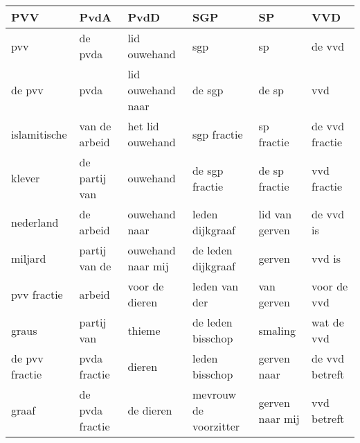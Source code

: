 \begin{tabular}{llllll}
\toprule
            PVV &             PvdA &               PvdD &                    SGP &               SP &             VVD \\
\midrule
            pvv &          de pvda &       lid ouwehand &                    sgp &               sp &          de vvd \\
         de pvv &             pvda &  lid ouwehand naar &                 de sgp &            de sp &             vvd \\
   islamitische &    van de arbeid &   het lid ouwehand &            sgp fractie &       sp fractie &  de vvd fractie \\
         klever &    de partij van &           ouwehand &         de sgp fractie &    de sp fractie &     vvd fractie \\
      nederland &        de arbeid &      ouwehand naar &        leden dijkgraaf &   lid van gerven &       de vvd is \\
        miljard &    partij van de &  ouwehand naar mij &     de leden dijkgraaf &           gerven &          vvd is \\
    pvv fractie &           arbeid &     voor de dieren &          leden van der &       van gerven &     voor de vvd \\
          graus &       partij van &             thieme &      de leden bisschop &          smaling &      wat de vvd \\
 de pvv fractie &     pvda fractie &             dieren &         leden bisschop &      gerven naar &  de vvd betreft \\
          graaf &  de pvda fractie &          de dieren &  mevrouw de voorzitter &  gerven naar mij &     vvd betreft \\
\bottomrule
\end{tabular}
